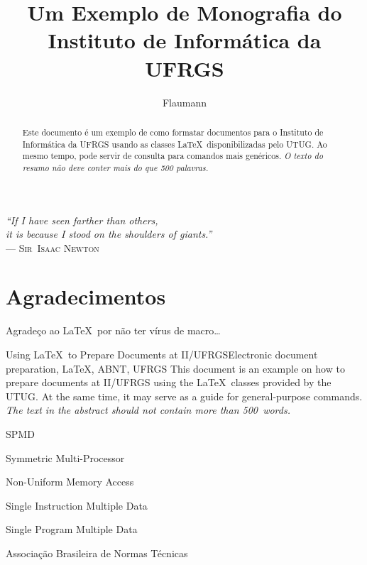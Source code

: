 \documentclass[ppgc,ti]{iiufrgs}
\title{Um Exemplo de Monografia do Instituto de Informática da UFRGS}
\author{Flaumann}{Fritz Gutenberg}
\begin{document}
\maketitle

\clearpage
\begin{flushright}
\mbox{}\vfill
{\sffamily\itshape
``If I have seen farther than others,\\
it is because I stood on the shoulders of giants.''\\}
--- \textsc{Sir~Isaac Newton}
\end{flushright}

\chapter*{Agradecimentos}
Agradeço ao \LaTeX\ por não ter vírus de macro\ldots



\begin{abstract}
Este documento é um exemplo de como formatar documentos para o
Instituto de Informática da UFRGS usando as classes \LaTeX\
disponibilizadas pelo UTUG\@. Ao mesmo tempo, pode servir de consulta
para comandos mais genéricos. \emph{O texto do resumo não deve
conter mais do que 500 palavras.}
\end{abstract}

\begin{englishabstract}{Using \LaTeX\ to Prepare Documents at II/UFRGS}{Electronic document preparation, \LaTeX, ABNT, UFRGS}
This document is an example on how to prepare documents at II/UFRGS
using the \LaTeX\ classes provided by the UTUG\@. At the same time, it
may serve as a guide for general-purpose commands. \emph{The text in
the abstract should not contain more than 500~words.}
\end{englishabstract}

\begin{listofabbrv}{SPMD}
        \item[SMP] Symmetric Multi-Processor
        \item[NUMA] Non-Uniform Memory Access
        \item[SIMD] Single Instruction Multiple Data
        \item[SPMD] Single Program Multiple Data
        \item[ABNT] Associação Brasileira de Normas Técnicas
\end{listofabbrv}
\end{document}
